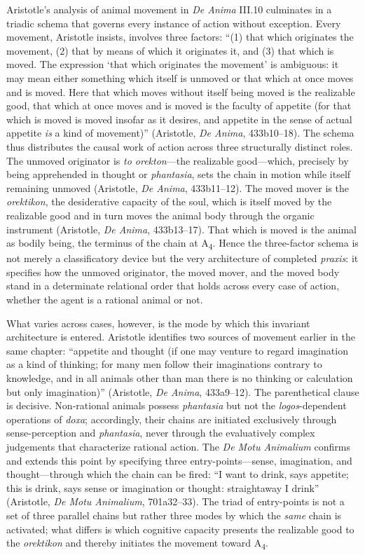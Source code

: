 \documentclass{article}
\begin{document}
Aristotle's analysis of animal movement in \textit{De Anima} III.10 culminates in a triadic schema that governs every instance of action without exception. Every movement, Aristotle insists, involves three factors: ``(1) that which originates the movement, (2) that by means of which it originates it, and (3) that which is moved. The expression `that which originates the movement' is ambiguous: it may mean either something which itself is unmoved or that which at once moves and is moved. Here that which moves without itself being moved is the realizable good, that which at once moves and is moved is the faculty of appetite (for that which is moved is moved insofar as it desires, and appetite in the sense of actual appetite \textit{is} a kind of movement)'' (Aristotle, \textit{De Anima}, 433b10--18). The schema thus distributes the causal work of action across three structurally distinct roles. The unmoved originator is \textit{to orekton}---the realizable good---which, precisely by being apprehended in thought or \textit{phantasia}, sets the chain in motion while itself remaining unmoved (Aristotle, \textit{De Anima}, 433b11--12). The moved mover is the \textit{orektikon}, the desiderative capacity of the soul, which is itself moved by the realizable good and in turn moves the animal body through the organic instrument (Aristotle, \textit{De Anima}, 433b13--17). That which is moved is the animal as bodily being, the terminus of the chain at A\textsubscript{4}. Hence the three-factor schema is not merely a classificatory device but the very architecture of completed \textit{praxis}: it specifies how the unmoved originator, the moved mover, and the moved body stand in a determinate relational order that holds across every case of action, whether the agent is a rational animal or not.

What varies across cases, however, is the mode by which this invariant architecture is entered. Aristotle identifies two sources of movement earlier in the same chapter: ``appetite and thought (if one may venture to regard imagination as a kind of thinking; for many men follow their imaginations contrary to knowledge, and in all animals other than man there is no thinking or calculation but only imagination)'' (Aristotle, \textit{De Anima}, 433a9--12). The parenthetical clause is decisive. Non-rational animals possess \textit{phantasia} but not the \textit{logos}-dependent operations of \textit{doxa}; accordingly, their chains are initiated exclusively through sense-perception and \textit{phantasia}, never through the evaluatively complex judgements that characterize rational action. The \textit{De Motu Animalium} confirms and extends this point by specifying three entry-points---sense, imagination, and thought---through which the chain can be fired: ``I want to drink, says appetite; this is drink, says sense or imagination or thought: straightaway I drink'' (Aristotle, \textit{De Motu Animalium}, 701a32--33). The triad of entry-points is not a set of three parallel chains but rather three modes by which the \textit{same} chain is activated; what differs is which cognitive capacity presents the realizable good to the \textit{orektikon} and thereby initiates the movement toward A\textsubscript{4}.
\end{document}
